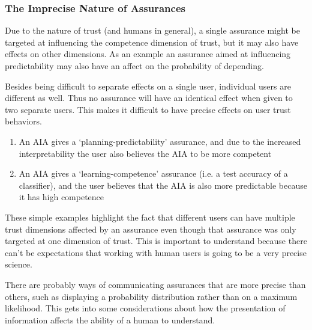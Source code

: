 




\subsubsection{The Imprecise Nature of Assurances}\label{sec:imprecise}
    Due to the nature of trust (and humans in general), a single assurance might be targeted at influencing the competence dimension of trust, but it may also have effects on other dimensions. As an example an assurance aimed at influencing predictability may also have an affect on the probability of depending.

    Besides being difficult to separate effects on a single user, individual users are different as well. Thus no assurance will have an identical effect when given to two separate users. This makes it difficult to have precise effects on user trust behaviors.

    \begin{enumerate}
        \item An AIA gives a `planning-predictability' assurance, and due to the increased interpretability the user also believes the AIA to be more competent
        \item An AIA gives a `learning-competence' assurance (i.e. a test accuracy of a classifier), and the user believes that the AIA is also more predictable because it has high competence
    \end{enumerate}

    These simple examples highlight the fact that different users can have multiple trust dimensions affected by an assurance even though that assurance was only targeted at one dimension of trust. This is important to understand because there can't be expectations that working with human users is going to be a very precise science.

    There are probably ways of communicating assurances that are more precise than others, such as displaying a probability distribution rather than on a maximum likelihood. This gets into some considerations about how the presentation of information affects the ability of a human to understand.

